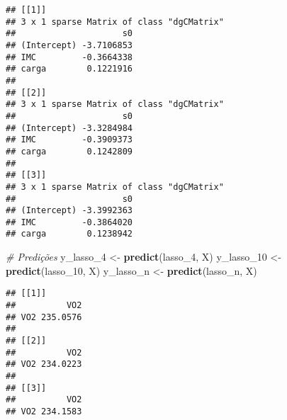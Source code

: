 \documentclass[]{article}
\newenvironment{Shaded}{\begin{snugshade}}{\end{snugshade}}
\newcommand{\CommentTok}[1]{\textcolor[rgb]{0.56,0.35,0.01}{\textit{#1}}}
\newcommand{\DecValTok}[1]{\textcolor[rgb]{0.00,0.00,0.81}{#1}}
\newcommand{\KeywordTok}[1]{\textcolor[rgb]{0.13,0.29,0.53}{\textbf{#1}}}
\newcommand{\NormalTok}[1]{#1}
\newcommand{\OperatorTok}[1]{\textcolor[rgb]{0.81,0.36,0.00}{\textbf{#1}}}
\newcommand{\StringTok}[1]{\textcolor[rgb]{0.31,0.60,0.02}{#1}}
\begin{document}
\begin{verbatim}
## [[1]]
## 3 x 1 sparse Matrix of class "dgCMatrix"
##                     s0
## (Intercept) -3.7106853
## IMC         -0.3664338
## carga        0.1221916
## 
## [[2]]
## 3 x 1 sparse Matrix of class "dgCMatrix"
##                     s0
## (Intercept) -3.3284984
## IMC         -0.3909373
## carga        0.1242809
## 
## [[3]]
## 3 x 1 sparse Matrix of class "dgCMatrix"
##                     s0
## (Intercept) -3.3992363
## IMC         -0.3864020
## carga        0.1238942
\end{verbatim}

\begin{Shaded}
\begin{Highlighting}[]
\CommentTok{# Predições}
\NormalTok{y_lasso_}\DecValTok{4}\NormalTok{ <-}\StringTok{ }\KeywordTok{predict}\NormalTok{(lasso_}\DecValTok{4}\NormalTok{, X)}
\NormalTok{y_lasso_}\DecValTok{10}\NormalTok{ <-}\StringTok{ }\KeywordTok{predict}\NormalTok{(lasso_}\DecValTok{10}\NormalTok{, X)}
\NormalTok{y_lasso_n <-}\StringTok{ }\KeywordTok{predict}\NormalTok{(lasso_n, X)}
\end{Highlighting}
\end{Shaded}

\begin{Shaded}
\end{Shaded}

\begin{verbatim}
## [[1]]
##          VO2
## VO2 235.0576
## 
## [[2]]
##          VO2
## VO2 234.0223
## 
## [[3]]
##          VO2
## VO2 234.1583
\end{verbatim}
\end{document}
